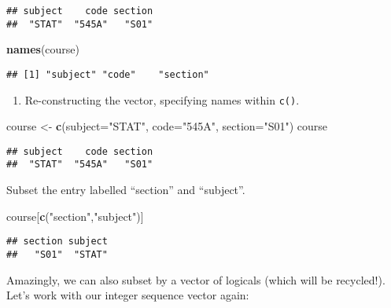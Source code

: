 \documentclass[]{article}
\newenvironment{Shaded}{\begin{snugshade}}{\end{snugshade}}
\newcommand{\KeywordTok}[1]{\textcolor[rgb]{0.13,0.29,0.53}{\textbf{#1}}}
\newcommand{\DataTypeTok}[1]{\textcolor[rgb]{0.13,0.29,0.53}{#1}}
\newcommand{\StringTok}[1]{\textcolor[rgb]{0.31,0.60,0.02}{#1}}
\newcommand{\NormalTok}[1]{#1}
\providecommand{\tightlist}{%
  \setlength{\itemsep}{0pt}\setlength{\parskip}{0pt}}
\begin{document}
\begin{verbatim}
## subject    code section 
##  "STAT"  "545A"   "S01"
\end{verbatim}

\begin{Shaded}
\begin{Highlighting}[]
\KeywordTok{names}\NormalTok{(course)}
\end{Highlighting}
\end{Shaded}

\begin{verbatim}
## [1] "subject" "code"    "section"
\end{verbatim}

\begin{enumerate}
\def\labelenumi{\arabic{enumi}.}
\setcounter{enumi}{2}
\tightlist
\item
  Re-constructing the vector, specifying names within \texttt{c()}.
\end{enumerate}

\begin{Shaded}
\begin{Highlighting}[]
\NormalTok{course <-}\StringTok{ }\KeywordTok{c}\NormalTok{(}\DataTypeTok{subject=}\StringTok{"STAT"}\NormalTok{, }\DataTypeTok{code=}\StringTok{"545A"}\NormalTok{, }\DataTypeTok{section=}\StringTok{"S01"}\NormalTok{)}
\NormalTok{course}
\end{Highlighting}
\end{Shaded}

\begin{verbatim}
## subject    code section 
##  "STAT"  "545A"   "S01"
\end{verbatim}

Subset the entry labelled ``section'' and ``subject''.

\begin{Shaded}
\begin{Highlighting}[]
\NormalTok{course[}\KeywordTok{c}\NormalTok{(}\StringTok{"section"}\NormalTok{,}\StringTok{"subject"}\NormalTok{)]}
\end{Highlighting}
\end{Shaded}

\begin{verbatim}
## section subject 
##   "S01"  "STAT"
\end{verbatim}

Amazingly, we can also subset by a vector of logicals (which will be
recycled!). Let's work with our integer sequence vector again:
\end{document}
